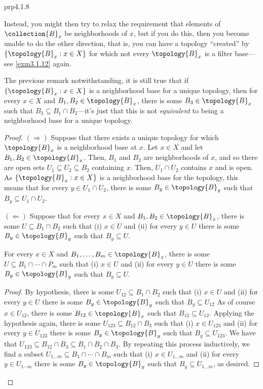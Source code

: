 \begin{prp}{}{prp4.1.8}
\begin{rmk}
Instead, you might then try to relax the requirement that elements of $\collection{B}_x$ be neighborhoods of $x$, but if you do this, then you become unable to do the other direction, that is, you can have a topology ``created'' by $\{ \topology{B}_x:x\in X\}$ for which not every $\topology{B}_x$ is a filter base---see \cref{exm3.1.12} again.
\end{rmk}
\begin{rmk}
The previous remark notwithstanding, it is still true that if $\{ \topology{B}_x:x\in X\}$ is a neighborhood base for a unique topology, then for every $x\in X$ and $B_1,B_2\in \topology{B}_x$, there is some $B_3\in \topology{B}_x$ such that $B_3\subseteq B_1\cap B_2$---it's just that this is not \emph{equivalent} to being a neighborhood base for a unique topology.
\end{rmk}
\begin{proof}
$(\Rightarrow )$ Suppose that there exists a unique topology for which $\topology{B}_x$ is a neighborhood base at $x$.  Let $x\in X$ and let $B_1,B_2\in \topology{B}_x$.  Then, $B_1$ and $B_2$ are neighborhoods of $x$, and so there are open sets $U_1\subseteq U_2\subseteq B_2$ containing $x$.  Then, $U_1\cap U_2$ contains $x$ and is open.  As $\{ \topology{B}_x:x\in X\}$ is a neighborhood base for the topology, this means that for every $y\in U_1\cap U_2$, there is some $B_y\in \topology{B}_y$ such that $B_y\subseteq U_1\cap U_2$.
	
\blankline
\noindent
$(\Leftarrow )$ Suppose that for every $x\in X$ and $B_1,B_2\in \topology{B}_x$, there is some $U\subseteq B_1\cap B_2$ such that (i) $x\in U$ and (ii) for every $y\in U$ there is some $B_y\in \topology{B}_y$ such that $B_y\subseteq U$.

\begin{clm}[breakable=false]{}{}
For every $x\in X$ and $B_1,\ldots ,B_m\in \topology{B}_x$, there is some $U\subseteq B_1\cap \cdots \cap P_m$ such that (i) $x\in U$ and (ii) for every $y\in U$ there is some $B_y\in \topology{B}_y$ such that $B_y\subseteq U$.
\begin{proof}
By hypothesis, there is some $U_{12}\subseteq B_1\cap B_2$ such that (i) $x\in U$ and (ii) for every $y\in U$ there is some $B_y\in \topology{B}_y$ such that $B_y\subseteq U_{12}$  As of course $x\in U_{12}$, there is some $B_{12}\in \topology{B}_x$ such that $B_{12}\subseteq U_{12}$.  Applying the hypothesis again, there is some $U_{123}\subseteq B_{12}\cap B_3$ such that (i) $x\in U_{123}$ and (ii) for every $y\in U_{123}$ there is some $B_y\in \topology{B}_y$ such that $B_y\subseteq U_{123}$.  We have that $U_{123}\subseteq B_{12}\cap B_3\subseteq B_1\cap B_2\cap B_3$.  By repeating this process inductively, we find a subset $U_{1\dots m}\subseteq B_1\cap \cdots \cap B_m$ such that (i) $x\in U_{1\dots m}$ and (ii) for every $y\in U_{1\cdots m}$ there is some $B_y\in \topology{B}_y$ such that $B_y\subseteq U_{1\dots m}$, as desired.
\end{proof}
\end{clm}


\end{proof}
\end{prp}

